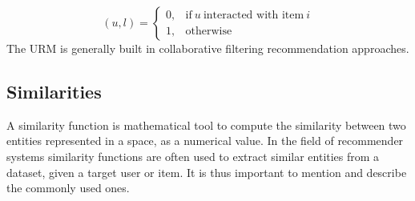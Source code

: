\begin{itemize}
\begin{equation*}
(u,l)=
\begin{cases}
0, & \text{if}\ u\ \text{interacted with item}\ i\\
1, & \text{otherwise}
\end{cases}
\end{equation*}
The URM is generally built in collaborative filtering recommendation approaches.
\end{itemize}


\subsection{Similarities}

A similarity function is mathematical tool to compute the similarity between two entities represented in a space, as a numerical value. In the field of recommender systems similarity functions are often used to extract similar entities from a dataset, given a target user or item. It is thus important to mention and describe the commonly used ones.
